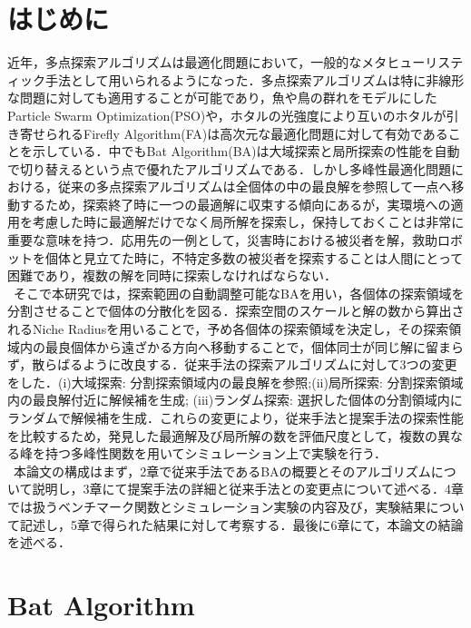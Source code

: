 \documentclass{jarticle}
\begin{document}
\section{はじめに}
近年，多点探索アルゴリズムは最適化問題において，一般的なメタヒューリスティック手法として用いられるようになった．多点探索アルゴリズムは特に非線形な問題に対しても適用することが可能であり，魚や鳥の群れをモデルにしたParticle Swarm Optimization(PSO)\cite{PSO}や，ホタルの光強度により互いのホタルが引き寄せられるFirefly Algorithm(FA)\cite{FA}は高次元な最適化問題に対して有効であることを示している．中でもBat Algorithm(BA)は大域探索と局所探索の性能を自動で切り替えるという点で優れたアルゴリズムである\cite{BA}．しかし多峰性最適化問題における，従来の多点探索アルゴリズムは全個体の中の最良解を参照して一点へ移動するため，探索終了時に一つの最適解に収束する傾向にあるが，実環境への適用を考慮した時に最適解だけでなく局所解を探索し，保持しておくことは非常に重要な意味を持つ．応用先の一例として，災害時における被災者を解，救助ロボットを個体と見立てた時に，不特定多数の被災者を探索することは人間にとって困難であり，複数の解を同時に探索しなければならない．\\ \
そこで本研究では，探索範囲の自動調整可能なBAを用い，各個体の探索領域を分割させることで個体の分散化を図る．探索空間のスケールと解の数から算出されるNiche Radius\cite{niche}を用いることで，予め各個体の探索領域を決定し，その探索領域内の最良個体から遠ざかる方向へ移動することで，個体同士が同じ解に留まらず，散らばるように改良する．従来手法の探索アルゴリズムに対して3つの変更をした．(i)大域探索: 分割探索領域内の最良解を参照;(ii)局所探索: 分割探索領域内の最良解付近に解候補を生成; (iii)ランダム探索: 選択した個体の分割領域内にランダムで解候補を生成．これらの変更により，従来手法と提案手法の探索性能を比較するため，発見した最適解及び局所解の数を評価尺度として，複数の異なる峰を持つ多峰性関数を用いてシミュレーション上で実験を行う．\\ \
本論文の構成はまず，2章で従来手法であるBAの概要とそのアルゴリズムについて説明し，3章にて提案手法の詳細と従来手法との変更点について述べる．4章では扱うベンチマーク関数とシミュレーション実験の内容及び，実験結果について記述し，5章で得られた結果に対して考察する．最後に6章にて，本論文の結論を述べる．

\section{Bat Algorithm}
\end{document}
